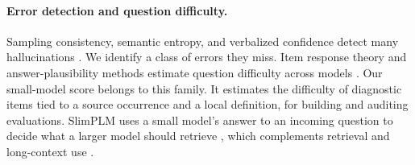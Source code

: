 \paragraph{Error detection and question difficulty.}
Sampling consistency, semantic entropy, and verbalized confidence detect many hallucinations \citep{selfcheckgpt,semantic-uncertainty,semantic-entropy,verbal-confidence}. We identify a class of errors they miss. Item response theory and answer-plausibility methods estimate question difficulty across models \citep{vania-etal-2021-comparing,byrd-srivastava-2022-predicting,mozafari-etal-2026-question}. Our small-model score belongs to this family. It estimates the difficulty of diagnostic items tied to a source occurrence and a local definition, for building and auditing evaluations. SlimPLM uses a small model's answer to an incoming question to decide what a larger model should retrieve \citep{tan-etal-2024-small}, which complements retrieval and long-context use \citep{rag,lost-middle}.
